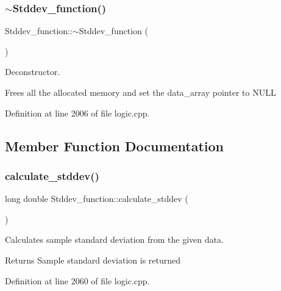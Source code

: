 \subsubsection{\texorpdfstring{$\sim$Stddev\_function()}{~Stddev\_function()}}
{\footnotesize\ttfamily Stddev\+\_\+function\+::$\sim$\+Stddev\+\_\+function (\begin{DoxyParamCaption}{ }\end{DoxyParamCaption})}



Deconstructor. 

Frees all the allocated memory and set the data\+\_\+array pointer to N\+U\+LL 

Definition at line 2006 of file logic.\+cpp.


\begin{DoxyCode}{0}

\end{DoxyCode}


\subsection{Member Function Documentation}
\mbox{\label{class_stddev__function_a99d48dedf85d9b9a35962114be1b3d48}} 
\subsubsection{\texorpdfstring{calculate\_stddev()}{calculate\_stddev()}}
{\footnotesize\ttfamily long double Stddev\+\_\+function\+::calculate\+\_\+stddev (\begin{DoxyParamCaption}{ }\end{DoxyParamCaption})}



Calculates sample standard deviation from the given data. 

\begin{DoxyReturn}{Returns}
Sample standard deviation is returned 
\end{DoxyReturn}


Definition at line 2060 of file logic.\+cpp.


\begin{DoxyCode}{0}

\end{DoxyCode}
\mbox{\label{class_stddev__function_ae02f118647d6a8a8d213856a0d0dbef4}} 
